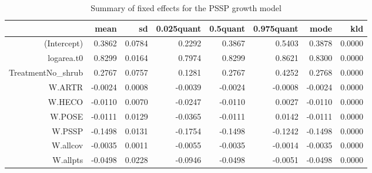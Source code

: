 \begin{table}[ht]
\centering
\caption{Summary of fixed effects for the PSSP growth model} 
\label{PSSPgrowth}
\begin{tabular}{rrrrrrrr}
  \hline
 & mean & sd & 0.025quant & 0.5quant & 0.975quant & mode & kld \\ 
  \hline
(Intercept) & 0.3862 & 0.0784 & 0.2292 & 0.3867 & 0.5403 & 0.3878 & 0.0000 \\ 
  logarea.t0 & 0.8299 & 0.0164 & 0.7974 & 0.8299 & 0.8621 & 0.8300 & 0.0000 \\ 
  TreatmentNo\_shrub & 0.2767 & 0.0757 & 0.1281 & 0.2767 & 0.4252 & 0.2768 & 0.0000 \\ 
  W.ARTR & -0.0024 & 0.0008 & -0.0039 & -0.0024 & -0.0008 & -0.0024 & 0.0000 \\ 
  W.HECO & -0.0110 & 0.0070 & -0.0247 & -0.0110 & 0.0027 & -0.0110 & 0.0000 \\ 
  W.POSE & -0.0111 & 0.0129 & -0.0365 & -0.0111 & 0.0142 & -0.0111 & 0.0000 \\ 
  W.PSSP & -0.1498 & 0.0131 & -0.1754 & -0.1498 & -0.1242 & -0.1498 & 0.0000 \\ 
  W.allcov & -0.0035 & 0.0011 & -0.0055 & -0.0035 & -0.0014 & -0.0035 & 0.0000 \\ 
  W.allpts & -0.0498 & 0.0228 & -0.0946 & -0.0498 & -0.0051 & -0.0498 & 0.0000 \\ 
   \hline
\end{tabular}
\end{table}

